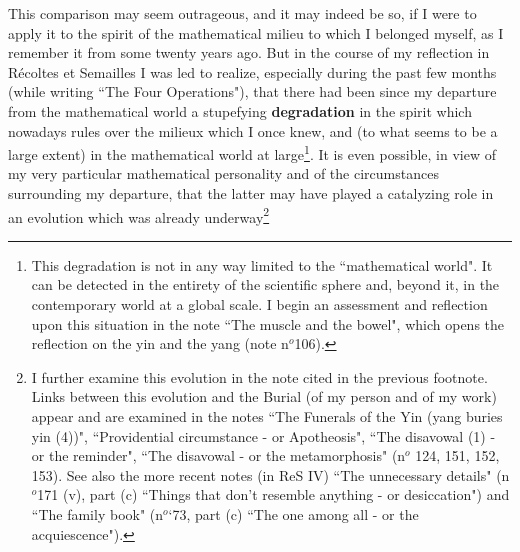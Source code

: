 This comparison may seem outrageous, and it may indeed be so, if I were to apply it to the spirit of the mathematical milieu to which I belonged myself, as I remember it from some twenty years ago. But in the course of my reflection in R\'ecoltes et Semailles I was led to realize, especially during the past few months (while writing ``The Four Operations"), that there had been since my departure from the mathematical world a stupefying \textbf{degradation} in the spirit which nowadays rules over the milieux which I once knew, and (to what seems to be a large extent) in the mathematical world at large\footnote{This degradation is not in any way limited to the ``mathematical world". It can be detected in the entirety of the scientific sphere and, beyond it, in the contemporary world at a global scale. I begin an assessment and reflection upon this situation in the note ``The muscle and the bowel", which opens the reflection on the yin and the yang (note n$^o$106).
}. It is even possible, in view of my very particular mathematical personality and of the circumstances surrounding my departure, that the latter may have played a catalyzing role in an evolution which was already underway\footnote{I further examine this evolution in the note cited in the previous footnote. Links between this evolution and the Burial (of my person and of my work) appear and are examined in the notes ``The Funerals of the Yin (yang buries yin (4))", ``Providential circumstance - or Apotheosis", ``The disavowal (1) - or the reminder", ``The disavowal - or the metamorphosis" (n$^o$ 124, 151, 152, 153). See also the more recent notes (in ReS IV) ``The unnecessary details" (n$^o$171 (v), part (c) ``Things that don't resemble anything - or desiccation") and ``The family book" (n$^o$`73, part (c) ``The one among all - or the acquiescence").
}
